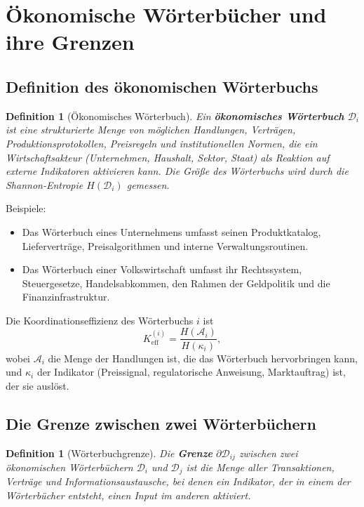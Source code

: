 \documentclass[12pt,a4paper]{article}
\newtheorem{definition}[theorem]{Definition}
\theoremstyle{remark}
\begin{document}
	\section{Ökonomische Wörterbücher und ihre Grenzen}
	
	\subsection{Definition des ökonomischen Wörterbuchs}
	
	\begin{definition}[Ökonomisches Wörterbuch]
		Ein \textbf{ökonomisches Wörterbuch} \(\mathcal{D}_i\) ist eine strukturierte Menge von möglichen Handlungen, Verträgen, Produktionsprotokollen, Preisregeln und institutionellen Normen, die ein Wirtschaftsakteur (Unternehmen, Haushalt, Sektor, Staat) als Reaktion auf externe Indikatoren aktivieren kann. Die Größe des Wörterbuchs wird durch die Shannon-Entropie \(H(\mathcal{D}_i)\) gemessen.
	\end{definition}
	
	Beispiele:
	\begin{itemize}
		\item Das Wörterbuch eines Unternehmens umfasst seinen Produktkatalog, Lieferverträge, Preisalgorithmen und interne Verwaltungsroutinen.
		\item Das Wörterbuch einer Volkswirtschaft umfasst ihr Rechtssystem, Steuergesetze, Handelsabkommen, den Rahmen der Geldpolitik und die Finanzinfrastruktur.
	\end{itemize}
	
	Die Koordinationseffizienz des Wörterbuchs \(i\) ist
	\begin{equation}
		K_{\mathrm{eff}}^{(i)} = \frac{H(\mathcal{A}_i)}{H(\kappa_i)},
		\label{eq:keff_econ}
	\end{equation}
	wobei \(\mathcal{A}_i\) die Menge der Handlungen ist, die das Wörterbuch hervorbringen kann, und \(\kappa_i\) der Indikator (Preissignal, regulatorische Anweisung, Marktauftrag) ist, der sie auslöst.
	
	\subsection{Die Grenze zwischen zwei Wörterbüchern}
	
	\begin{definition}[Wörterbuchgrenze]
		Die \textbf{Grenze} \(\partial\mathcal{D}_{ij}\) zwischen zwei ökonomischen Wörterbüchern \(\mathcal{D}_i\) und \(\mathcal{D}_j\) ist die Menge aller Transaktionen, Verträge und Informationsaustausche, bei denen ein Indikator, der in einem der Wörterbücher entsteht, einen Input im anderen aktiviert.
	\end{definition}
	
\end{document}
